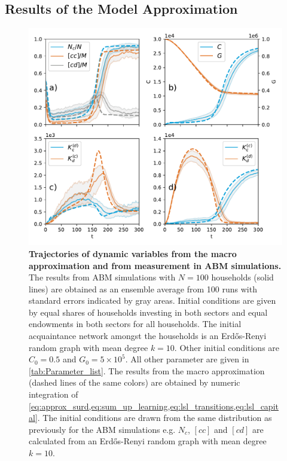 \subsection{Results of the Model Approximation}

\begin{figure}[ht!]
  \hspace{-.1cm}\centering\includegraphics[width=1.1\linewidth]{figures/micro_vs_approx_v2.pdf}
  \caption[Comparison of numerical simulations with analytical approximation.]{\textbf{Trajectories of dynamic variables from the macro approximation and from measurement in ABM simulations.} The results from ABM simulations with $N=100$ households (solid lines) are obtained as an ensemble average from 100 runs with standard errors indicated by gray areas. Initial conditions are given by equal shares of households investing in both sectors and equal endowments in both sectors for all households. The initial acquaintance network amongst the households is an Erd\H{o}s-Renyi random graph with mean degree $k=10$. Other initial conditions are $C_0=0.5$ and $G_0=5 \times 10^5$. All other parameter are given in \cref{tab:Parameter_list}. The results from the macro approximation (dashed lines of the same colors) are obtained by numeric integration of \cref{eq:approx_surd,eq:sum_up_learning,eq:lsl_transitions,eq:lsl_capital}. The initial conditions are drawn from the same distribution as previously for the ABM simulations e.g. $N_c$, $[cc]$ and $[cd]$ are calculated from an Erd\H{o}s-Renyi random graph with mean degree $k=10$.}
\label{fig:comparison2}
\end{figure}
